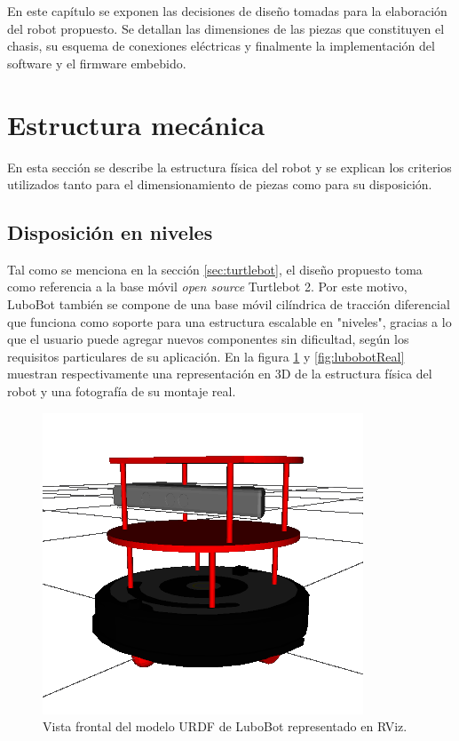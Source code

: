 \label{Capitulo3}

En este capítulo se exponen las decisiones de diseño tomadas para la elaboración del robot propuesto. Se detallan las dimensiones de las piezas que constituyen el chasis, su esquema de conexiones eléctricas y finalmente la implementación del software y el firmware embebido.

\section{Estructura mecánica}

En esta sección se describe la estructura física del robot y se explican los criterios utilizados tanto para el dimensionamiento de piezas como para su disposición.

\subsection{Disposición en niveles}
Tal como se menciona en la sección \ref{sec:turtlebot}, el diseño propuesto toma como referencia a la base móvil \textit{open source} Turtlebot 2. Por este motivo, LuboBot también se compone de una base móvil cilíndrica de tracción diferencial que funciona como soporte para una estructura escalable en "niveles", gracias a lo que el usuario puede agregar nuevos componentes sin dificultad, según los requisitos particulares de su aplicación. En la figura \ref{fig:lubobotURDF} y \ref{fig:lubobotReal} muestran respectivamente una representación en 3D de la estructura física del robot y una fotografía de su montaje real.

\begin{figure}[ht]
  \centering
  \includegraphics[scale=0.5]{./Figures/lubobot_urdf.png}
  \caption{Vista frontal del modelo URDF de LuboBot representado en RViz.}
  \label{fig:lubobotURDF}
\end{figure}

